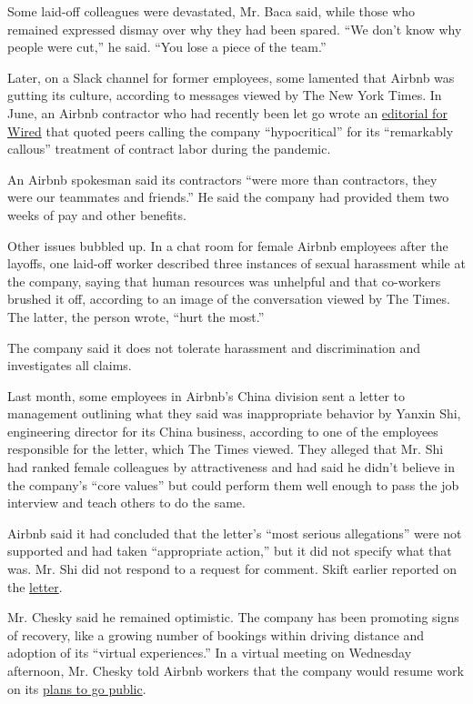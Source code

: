 Some laid-off colleagues were devastated, Mr. Baca said, while those who
remained expressed dismay over why they had been spared. ``We don't know
why people were cut,'' he said. ``You lose a piece of the team.''

Later, on a Slack channel for former employees, some lamented that
Airbnb was gutting its culture, according to messages viewed by The New
York Times. In June, an Airbnb contractor who had recently been let go
wrote an
\href{https://www.wired.com/story/airbnb-quietly-fired-hundreds-of-contract-workers-im-one-of-them/}{editorial
for Wired} that quoted peers calling the company ``hypocritical'' for
its ``remarkably callous'' treatment of contract labor during the
pandemic.

An Airbnb spokesman said its contractors ``were more than contractors,
they were our teammates and friends.'' He said the company had provided
them two weeks of pay and other benefits.

Other issues bubbled up. In a chat room for female Airbnb employees
after the layoffs, one laid-off worker described three instances of
sexual harassment while at the company, saying that human resources was
unhelpful and that co-workers brushed it off, according to an image of
the conversation viewed by The Times. The latter, the person wrote,
``hurt the most.''

The company said it does not tolerate harassment and discrimination and
investigates all claims.

Last month, some employees in Airbnb's China division sent a letter to
management outlining what they said was inappropriate behavior by Yanxin
Shi, engineering director for its China business, according to one of
the employees responsible for the letter, which The Times viewed. They
alleged that Mr. Shi had ranked female colleagues by attractiveness and
had said he didn't believe in the company's ``core values'' but could
perform them well enough to pass the job interview and teach others to
do the same.

Airbnb said it had concluded that the letter's ``most serious
allegations'' were not supported and had taken ``appropriate action,''
but it did not specify what that was. Mr. Shi did not respond to a
request for comment. Skift earlier reported on the
\href{https://skift.com/2020/06/12/airbnb-investigates-allegations-of-sexual-harassment-against-a-top-chinese-exec/}{letter}.

Mr. Chesky said he remained optimistic. The company has been promoting
signs of recovery, like a growing number of bookings within driving
distance and adoption of its ``virtual experiences.'' In a virtual
meeting on Wednesday afternoon, Mr. Chesky told Airbnb workers that the
company would resume work on its
\href{https://www.nytimes.com/2020/07/15/technology/airbnb-ipo.html}{plans
to go public}.

